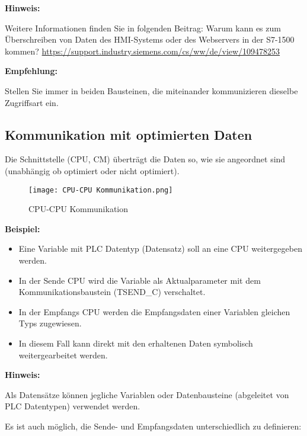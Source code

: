 \noindent \textbf{Hinweis:}\par \noindent
Weitere Informationen finden Sie in folgenden Beitrag: 
Warum kann es zum Überschreiben von Daten des HMI-Systems oder des Webservers in der S7-1500 kommen? 
\url{https://support.industry.siemens.com/cs/ww/de/view/109478253}

\noindent \textbf{Empfehlung:}\par \noindent
Stellen Sie immer in beiden Bausteinen, die miteinander kommunizieren dieselbe Zugriffsart ein.

\subsection{Kommunikation mit optimierten Daten}\label{subsec:Kommunikation mit optimierten Daten}
Die Schnittstelle (CPU, CM) überträgt die Daten so, wie sie angeordnet sind (unabhängig ob optimiert oder nicht optimiert).


\begin{figure}[!ht]
    \centering
    \texttt{[image: CPU-CPU Kommunikation.png]}
    \caption{CPU-CPU Kommunikation}
    \label{fig:CPU-CPU Kommunikation}
\end{figure}

\textbf{Beispiel:}\par \noindent
\begin{itemize}
    \item Eine Variable mit PLC Datentyp (Datensatz) soll an eine CPU weitergegeben werden. 
    \item In der Sende CPU wird die Variable als Aktualparameter mit dem Kommunikationsbaustein (TSEND\_C) verschaltet.
    \item In der Empfangs CPU werden die Empfangsdaten einer Variablen gleichen Typs zugewiesen. 
    \item In diesem Fall kann direkt mit den erhaltenen Daten symbolisch weitergearbeitet werden.    
\end{itemize}

\noindent \textbf{Hinweis:}\par \noindent
Als Datensätze können jegliche Variablen oder Datenbausteine (abgeleitet von PLC Datentypen) verwendet werden.\par 

\noindent Es ist auch möglich, die Sende- und Empfangsdaten unterschiedlich zu definieren: \par




